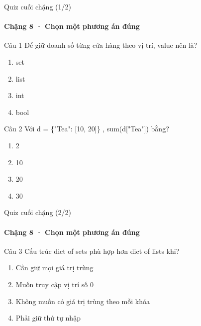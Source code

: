 \documentclass[aspectratio=169,10pt]{beamer}
\begin{document}
\begin{frame}[t]{Quiz cuối chặng (1/2)}
\framesubtitle{Chặng 8 · Chọn một phương án đúng}
\small
\begin{block}{Câu 1}
Để giữ doanh số từng cửa hàng theo vị trí, value nên là?\par\smallskip
\begin{enumerate}
\item set
\item list
\item int
\item bool
\end{enumerate}
\end{block}
\begin{block}{Câu 2}
Với d = \{"Tea": [10, 20]\} , sum(d["Tea"]) bằng?\par\smallskip
\begin{enumerate}
\item 2
\item 10
\item 20
\item 30
\end{enumerate}
\end{block}

\end{frame}

\begin{frame}[t]{Quiz cuối chặng (2/2)}
\framesubtitle{Chặng 8 · Chọn một phương án đúng}
\small
\begin{block}{Câu 3}
Cấu trúc dict of sets phù hợp hơn dict of lists khi?\par\smallskip
\begin{enumerate}
\item Cần giữ mọi giá trị trùng
\item Muốn truy cập vị trí số 0
\item Không muốn có giá trị trùng theo mỗi khóa
\item Phải giữ thứ tự nhập
\end{enumerate}
\end{block}

\end{frame}
\end{document}
